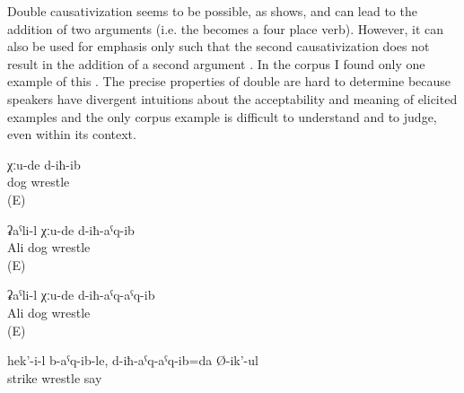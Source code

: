 Double causativization seems to be possible, as  shows, and can lead to the addition of two arguments (i.e. the   becomes a four place verb). However, it can also be used for emphasis only such that the second causativization does not result in the addition of a second argument . In the corpus I found only one example of this . The precise properties of double  are hard to determine because speakers have divergent intuitions about the acceptability and meaning of elicited examples and the only corpus example  is difficult to understand and to judge, even within its context.
%
\begin{exe}
	\ex	\label{ex:The dogs fought}
	\gll	χːu-de d-iħ-ib\\
		dog	wrestle\\
	\glt	{} (E)

	\ex	\label{ex:Ali made the dogs fight}
	\gll	ʡaˁli-l χːu-de d-iħ-aˁq-ib\\
		Ali dog	wrestle\\
	\glt	{} (E)

	\ex	\label{ex:Ali made the dogs fight UNCERTAIN INTERPRETATION}
	\gll	ʡaˁli-l χːu-de d-iħ-aˁq-aˁq-ib\\
		Ali dog	wrestle\\
	\glt	{}  (E)

	\ex	\label{ex:‎He hit her and (we) were made to fight, he says}
	\gll	hek'-i-l	b-aˁq-ib-le,	d-iħ-aˁq-aˁq-ib=da	Ø-ik'-ul\\
			strike	wrestle	say\\
	\glt	{}
\end{exe}


